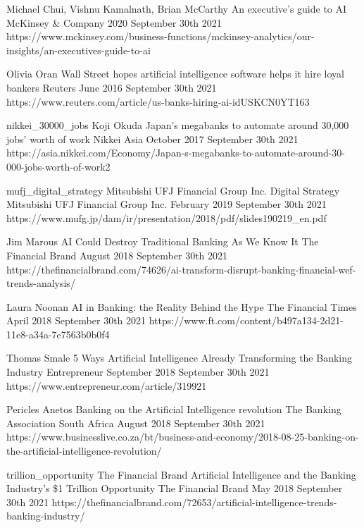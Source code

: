 \begin{thebibliography}{100}
{Michael Chui, Vishnu Kamalnath, Brian McCarthy}
{An executive’s guide to AI}
{McKinsey \& Company}
{2020}
{September 30th 2021}
{https://www.mckinsey.com/business-functions/mckinsey-analytics/our-insights/an-executives-guide-to-ai}

{Olivia Oran}
{Wall Street hopes artificial intelligence software helps it hire loyal bankers}
{Reuters}
{June 2016}
{September 30th 2021}
{https://www.reuters.com/article/us-banks-hiring-ai-idUSKCN0YT163}

\onlinebibitem
{nikkei_30000_jobs}
{Koji Okuda}
{Japan's megabanks to automate around 30,000 jobs' worth of work}
{Nikkei Asia}
{October 2017}
{September 30th 2021}
{https://asia.nikkei.com/Economy/Japan-s-megabanks-to-automate-around-30-000-jobs-worth-of-work2}

\onlinebibitem
{mufj_digital_strategy}
{Mitsubishi UFJ Financial Group Inc.}
{Digital Strategy}
{Mitsubishi UFJ Financial Group Inc.}
{February 2019}
{September 30th 2021}
{https://www.mufg.jp/dam/ir/presentation/2018/pdf/slides190219\_en.pdf}

{Jim Marous}
{AI Could Destroy Traditional Banking As We Know It}
{The Financial Brand}
{August 2018}
{September 30th 2021}
{https://thefinancialbrand.com/74626/ai-transform-disrupt-banking-financial-wef-trends-analysis/}

{Laura Noonan}
{AI in Banking: the Reality Behind the Hype}
{The Financial Times}
{April 2018}
{September 30th 2021}
{https://www.ft.com/content/b497a134-2d21-11e8-a34a-7e7563b0b0f4}

{Thomas Smale}
{5 Ways Artificial Intelligence Already Transforming the Banking Industry}
{Entrepreneur}
{September 2018}
{September 30th 2021}
{https://www.entrepreneur.com/article/319921}

{Pericles Anetos}
{Banking on the Artificial Intelligence revolution}
{The Banking Association South Africa}
{August 2018}
{September 30th 2021}
{https://www.businesslive.co.za/bt/business-and-economy/2018-08-25-banking-on-the-artificial-intelligence-revolution/}

\onlinebibitem
{trillion_opportunity}
{The Financial Brand}
{Artificial Intelligence and the Banking Industry’s \$1 Trillion Opportunity}
{The Financial Brand}
{May 2018}
{September 30th 2021}
{https://thefinancialbrand.com/72653/artificial-intelligence-trends-banking-industry/}


\end{thebibliography}
